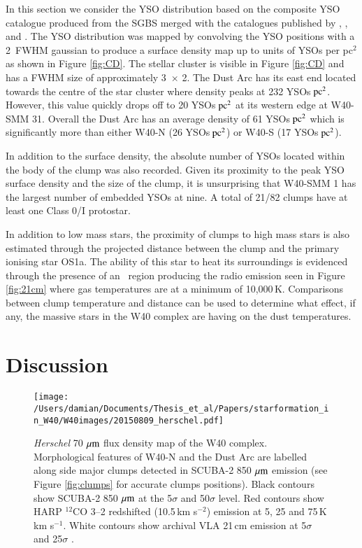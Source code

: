 In this section we consider the YSO distribution based on the composite YSO catalogue 
produced from the SGBS merged with the catalogues published by \cite{Kuhn:2010kl}, 
\cite{Rodriguez:2010bs}, \cite{Maury:2011ys} and \cite{Mallick:2013kx}. The YSO 
distribution was mapped by convolving the YSO positions with a 2\arcmin\ FWHM gaussian 
to produce a surface density map up to units of YSOs per pc$^{2}$ as shown in Figure 
\ref{fig:CD}. The stellar cluster is visible in Figure \ref{fig:CD} and has a FWHM size of 
approximately 3\arcsec\ $\times$ 2\arcsec. The Dust Arc has its east 
end located towards the centre of the star cluster where density peaks at 232 
YSOs$\hbox{ pc$^{2}$}$. However, this value quickly drops off to 20 YSOs$\hbox{ pc$^{2}$}$ 
at its western edge at W40-SMM 31. Overall the Dust Arc has an average density of 61 
YSOs$\hbox{ pc$^{2}$}$ which is significantly more than either W40-N (26 
YSOs$\hbox{ pc$^{2}$}$) or W40-S (17 YSOs$\hbox{ pc$^{2}$}$). 

In addition to the surface density, the absolute number of YSOs located within the body of 
the clump was also recorded. Given its proximity to the peak YSO surface density and the size 
of the clump, it is unsurprising that W40-SMM 1 has the largest number of embedded YSOs 
at nine. A total of 21/82 clumps have at least one Class 0/I protostar. 

In addition to low mass stars, the proximity of clumps to high mass stars is also estimated 
through the projected distance between the clump and the primary ionising star OS1a. 
The ability of this star to heat its surroundings is evidenced through the presence of an 
\HII\ region producing the radio emission seen in Figure \ref{fig:21cm} where gas temperatures 
are at a minimum of 10,000\,K. Comparisons between clump temperature and distance 
can be used to determine what effect, if any, the massive stars in the W40 complex are 
having on the dust temperatures. 


\section{Discussion}

\begin{figure*}
\begin{center}
\texttt{[image: /Users/damian/Documents/Thesis\_et\_al/Papers/starformation\_in\_W40/W40images/20150809\_herschel.pdf]}
\caption{\emph{Herschel} 70\,$\,\mu\rm{m}$ flux density map of the W40 complex. Morphological features of W40-N and the Dust Arc are labelled along side major clumps detected in SCUBA-2 850\,$\,\mu\rm{m}$ emission (see Figure \ref{fig:clumps} for accurate clumps positions). Black contours show SCUBA-2 850\,$\,\mu\rm{m}$ at the 5$\sigma$ and 50$\sigma$ level. Red contours show HARP $^{12}$CO 3\hbox{--}2 redshifted (10.5\,km s$^{-2}$) emission at 5, 25 and 75\,K\,km s$^{-1}$. White contours show archival VLA 21\,cm emission at 5$\sigma$ and 25$\sigma$ \citep{Condon:1998kx}.}
\label{fig:H70}
\end{center}
\end{figure*}

